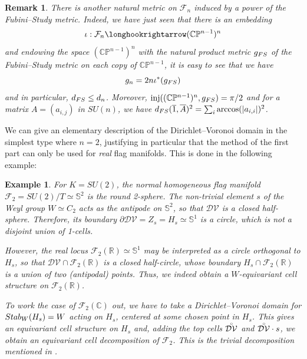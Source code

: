 \documentclass[11pt,twoside]{amsart}
\theoremstyle{plain}
\newtheorem{rem}[prop]{Remark}
\newtheorem{exemple}[prop]{Example}
\newcommand{\C}{{\mathbb C}}
\newcommand{\R}{{\mathbb R}}
\newcommand{\Sph}{\mathbb{S}}
\newcommand{\Pro}{\mathbb{P}}
\newcommand{\interior}[1]{\accentset{\circ}{#1}}
\DeclareMathOperator\inj{inj}
\begin{document}
\begin{rem}\label{fubini-study}
There is another natural metric on $\mathcal{F}_n$ induced by a power of the Fubini--Study metric. Indeed, we have just seen that there is an embedding %
\[\iota : \mathcal{F}_n\longhookrightarrow (\C\Pro^{n-1})^n\]
and endowing the space $(\C\Pro^{n-1})^n$ with the natural product metric $g_{\rm FS}$ of the Fubini--Study metric on each copy of $\C\Pro^{n-1}$, it is easy to see that we have
\[g_n=2n\iota^*(g_{\rm FS})\]
and in particular, $d_{\rm FS}\le d_n$. Moreover, $\inj((\C\Pro^{n-1})^n,g_{\rm FS})=\pi/2$ and for a matrix $A=(a_{i,j})$ in $SU(n)$, we have $d_{\rm FS}(\overline{1},\overline{A})^2=\sum_i\arccos(|a_{i,i}|)^2$. %
\end{rem}

We can give an elementary description of the Dirichlet--Voronoi domain in the simplest type where $n=2$, justifying in particular that the method of the first part can only be used for \textit{real} flag manifolds. This is done in the following example:
\begin{exemple}\label{examSU2}
For $K=SU(2)$, the normal homogeneous flag manifold $\mathcal{F}_2=SU(2)/T\simeq\Sph^2$ is the round 2-sphere. The non-trivial element $s$ of the Weyl group $W\simeq C_2$ acts as the antipode on $\Sph^2$, so that $\mathcal{DV}$ is a closed half-sphere. Therefore, its boundary $\partial\mathcal{DV}=Z_s=H_s\simeq\Sph^1$ is a circle, which is not a disjoint union of 1-cells.

However, the real locus $\mathcal{F}_2(\R)\simeq\Sph^1$ may be interpreted as a circle orthogonal to $H_s$, so that $\mathcal{DV}\cap\mathcal{F}_2(\R)$ is a closed half-circle, whose boundary $H_s\cap\mathcal{F}_2(\R)$ is a union of two (antipodal) points. Thus, we indeed obtain a $W$-equivariant cell structure on $\mathcal{F}_2(\R)$.

To work the case of $\mathcal{F}_2(\C)$ out, we have to take a Dirichlet--Voronoi domain for ${\rm Stab}_W(H_s)=W$ acting on $H_s$, centered at some \emph{chosen} point in $H_s$. This gives an equivariant cell structure on $H_s$ and, adding the top cells $\interior{\mathcal{DV}}$ and $\interior{\mathcal{DV}}\cdot s$, we obtain an equivariant cell decomposition of $\mathcal{F}_2$. This is the trivial decomposition mentioned in \cite[\S 4.4]{chirivi-garnier-spreafico}.
\end{exemple}
\end{document}
